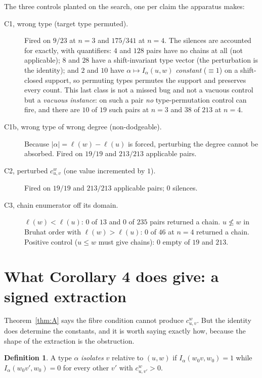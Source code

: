 \documentclass[11pt]{article}
\theoremstyle{plain}
\theoremstyle{definition}
\newtheorem{definition}[theorem]{Definition}
\newcommand{\wo}{w_0}
\begin{document}
The three controls planted on the search, one per claim the apparatus makes:

\begin{description}
\item[C1, wrong type (target type permuted).]  Fired on $9/23$ at $n=3$ and
  $175/341$ at $n=4$.  The silences are accounted for exactly, with quantifiers:
  $4$ and $128$ pairs have no chains at all (not applicable); $8$ and $28$ have
  a shift-invariant type vector (the perturbation is the identity); and $2$ and
  $10$ have $\alpha\mapsto I_\alpha(u,w)$ \emph{constant} ($\equiv1$) on a
  shift-closed support, so permuting types permutes the support and preserves
  every count.  This last class is not a missed bug and not a vacuous control
  but a \emph{vacuous instance}: on such a pair \emph{no} type-permutation
  control can fire, and there are $10$ of $19$ such pairs at $n=3$ and $38$ of
  $213$ at $n=4$.
\item[C1b, wrong type of wrong degree (non-dodgeable).]  Because
  $|\alpha|=\ell(w)-\ell(u)$ is forced, perturbing the degree cannot be absorbed.
  Fired on $19/19$ and $213/213$ applicable pairs.
\item[C2, perturbed $c^w_{u,v}$ (one value incremented by $1$).]  Fired on
  $19/19$ and $213/213$ applicable pairs; $0$ silences.
\item[C3, chain enumerator off its domain.]  $\ell(w)<\ell(u)$: $0$ of $13$ and
  $0$ of $235$ pairs returned a chain.  $u\not\le w$ in Bruhat order with
  $\ell(w)>\ell(u)$: $0$ of $46$ at $n=4$ returned a chain.  Positive control
  ($u\le w$ must give chains): $0$ empty of $19$ and $213$.
\end{description}

\section{What Corollary 4 does give: a signed extraction}

Theorem~\ref{thm:A} says the fibre condition cannot produce $c^w_{u,v}$.  But
the identity does determine the constants, and it is worth saying exactly how,
because the shape of the extraction is the obstruction.

\begin{definition}
A type $\alpha$ \emph{isolates} $v$ relative to $(u,w)$ if
$I_\alpha(\wo v,\wo)=1$ while $I_\alpha(\wo v',\wo)=0$ for every other $v'$ with
$c^w_{u,v'}>0$.
\end{definition}
\end{document}
